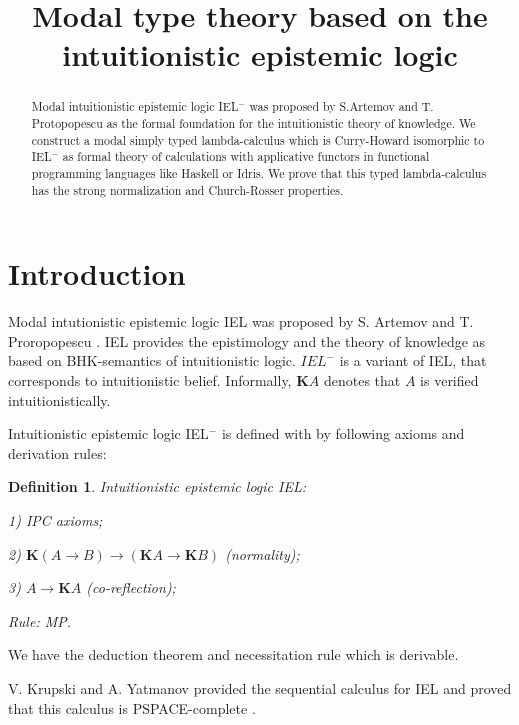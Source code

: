 \documentclass[a4paper]{article}
\date{}
\title{Modal type theory based on the intuitionistic epistemic logic}
\newtheorem{defin}{Definition}
\begin{document}
\maketitle

\begin{abstract}
Modal intuitionistic epistemic logic IEL$^{-}$ was proposed by S.Artemov and T. Protopopescu as the formal
foundation for the intuitionistic theory of knowledge. We construct a modal simply typed lambda-calculus
which is Curry-Howard isomorphic to IEL$^{-}$ as formal theory of calculations with applicative functors in
functional programming languages like Haskell or Idris. We prove that this typed lambda-calculus has the
strong normalization and Church-Rosser properties.
\end{abstract}



  \section{Introduction}

  Modal intutionistic epistemic logic IEL was proposed by S. Artemov and T. Proropopescu \cite{Artemov}. IEL
  provides the epistimology and the theory of knowledge as based on BHK-semantics of intuitionistic logic.
  $IEL^{-}$  is a variant of IEL, that corresponds to intuitionistic belief.
  Informally, $\textbf{K}A$ denotes that $A$ is verified intuitionistically.

  Intuitionistic epistemic logic IEL$^{-}$ is defined with by following axioms and derivation rules:

  \begin{defin} Intuitionistic epistemic logic IEL:

    1) IPC axioms;

    2) $\textbf{K}(A \to B) \to (\textbf{K}A \to \textbf{K}B)$ (normality);

    3) $A \to \textbf{K}A$ (co-reflection);

    Rule: MP.

  \end{defin}

  We have the deduction theorem and necessitation rule which is derivable.

  V. Krupski and  A. Yatmanov provided the sequential calculus for IEL and proved that this calculus is
  PSPACE-complete \cite{Krupski}.
\end{document}
